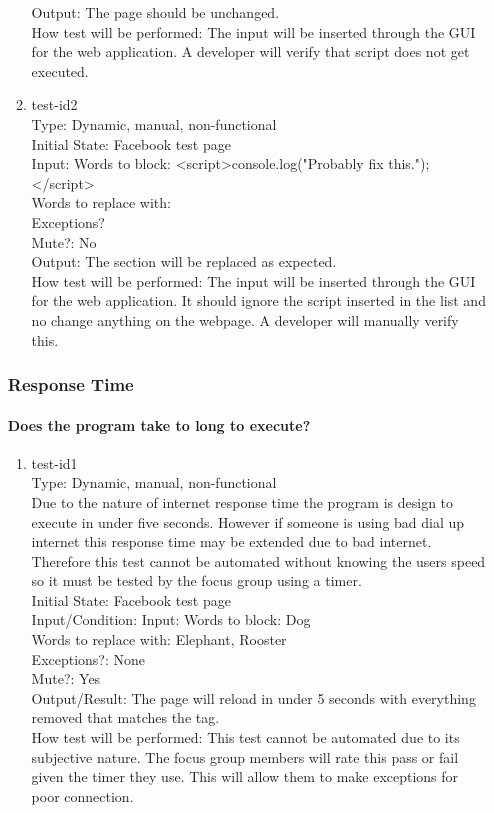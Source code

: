 \documentclass[12pt, titlepage]{article}
\begin{document}
\begin{enumerate}
\begin{enumerate}
Output: The page should be unchanged.\\
				
How test will be performed: The input will be inserted through the GUI for the web application. A developer will verify that script does not get executed.
					
\item{test-id2\\}
Type: Dynamic, manual, non-functional\\
					
Initial State: Facebook test page\\
					
Input:  Words to block: <script>console.log("Probably fix this.");</script> \\
Words to replace with:\\
Exceptions? \\
Mute?: No \\
					
Output: The section will be replaced as expected.  \\

How test will be performed: The input will be inserted through the GUI for the web application. It should ignore the script inserted in the list and no change anything on the webpage. A developer will manually verify this.
\end{enumerate}
\subsubsection{Response Time}
		
\paragraph{Does the program take to long to execute?}
\begin{enumerate}
\item{test-id1\\}
Type: Dynamic, manual, non-functional \\
 Due to the nature of internet response time the program is design to execute in under five seconds. However if someone is using bad dial up internet this response time may be extended due to bad internet. Therefore this test cannot be automated without knowing the users speed so it must be tested by the focus group using a timer.\\				
Initial State: Facebook test page\\
Input/Condition: Input: Words to block: Dog \\
Words to replace with: Elephant, Rooster\\
Exceptions?: None \\
Mute?: Yes		\\	
Output/Result: The page will reload in under 5 seconds with everything removed that matches the tag.\\
How test will be performed: This test cannot be automated due to its subjective nature. The focus group members will rate this pass or fail given the timer they use. This will allow them to make exceptions for poor connection.
					

\end{enumerate}
\end{enumerate}
\end{document}
